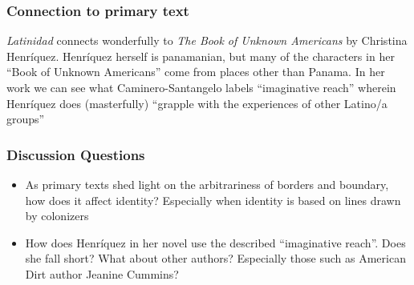 \documentclass[professionalfont]{beamer}
\begin{document}
\begin{frame}
\frametitle{Connection to primary text}
\textit{Latinidad} connects wonderfully to \textit{The Book of Unknown Americans} by Christina Henríquez. Henríquez herself is panamanian, but many of the characters in her ``Book of Unknown Americans'' come from places other than Panama. In her work we can see what Caminero-Santangelo labels ``imaginative reach'' wherein Henríquez does (masterfully) ``grapple with the experiences of other Latino/a groups''
\end{frame}

\begin{frame}
\frametitle{Discussion Questions}
\begin{itemize}
    \item As primary texts shed light on the arbitrariness of borders and boundary, how does it affect identity? Especially when identity is based on lines drawn by colonizers
    \item How does Henríquez in her novel use the described ``imaginative reach''. Does she fall short? What about other authors? Especially those such as American Dirt author Jeanine Cummins?
\end{itemize}
\end{frame}
\end{document}
